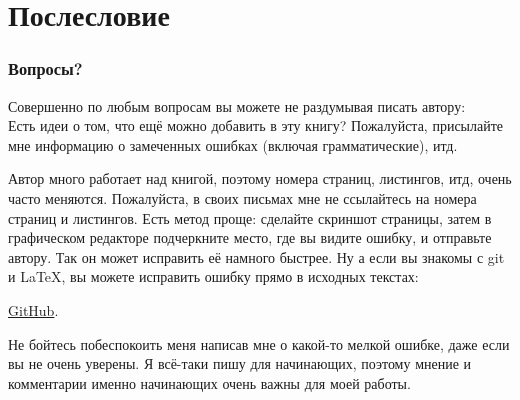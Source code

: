 \part*{Послесловие}

\section{Вопросы?}

Совершенно по любым вопросам вы можете не раздумывая писать автору: \\
\GTT{<\EMAIL>}
Есть идеи о том, что ещё можно добавить в эту книгу?
Пожалуйста, присылайте мне информацию о замеченных ошибках (включая грамматические), итд.

Автор много работает над книгой, поэтому номера страниц, листингов, итд, очень часто меняются.
Пожалуйста, в своих письмах мне не ссылайтесь на номера страниц и листингов.
Есть метод проще: сделайте скриншот страницы, затем в графическом редакторе подчеркните место, где вы видите
ошибку, и отправьте автору. Так он может исправить её намного быстрее.
Ну а если вы знакомы с git и \LaTeX, вы можете исправить ошибку прямо в исходных текстах:

\href{http://go.yurichev.com/17089}{GitHub}.

Не бойтесь побеспокоить меня написав мне о какой-то мелкой ошибке, даже если вы не очень уверены.
Я всё-таки пишу для начинающих, поэтому мнение и комментарии именно начинающих очень важны для моей работы.

